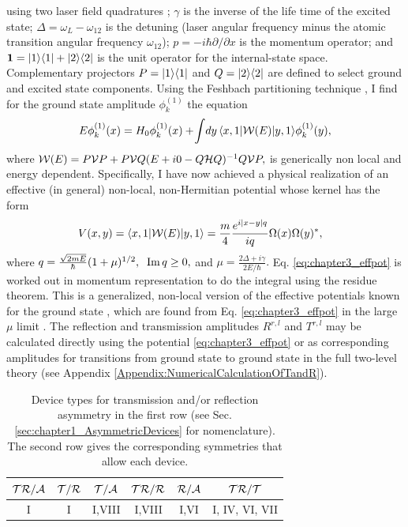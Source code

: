 using two  laser field quadratures  \cite{Zhang2013};
$\gamma$ is the inverse of the life time of the excited state;
$\Delta=\omega_{L}-\omega_{12}$
is the detuning (laser angular frequency minus the atomic transition
angular frequency $\omega_{12}$);
${p}=-i\hbar\partial/\partial x$ is the momentum operator;
and ${\bf 1}=|1\rangle\langle 1|+|2\rangle\langle 2|$ is the unit operator
for the internal-state space.
Complementary projectors
%
$P=|1\rangle\langle 1|$ and $Q=|2\rangle\langle 2|$
%
are defined to select ground and excited state components.
Using the Feshbach partitioning
technique \cite{Feshbach1958,Feshbach1962,Levine1969},
I find for the ground
state amplitude $\phi_k^{(1)}$ the equation
%
\begin{equation}\label{effecti}
  E\phi_k^{(1)}(x) = H_0\phi_k^{(1)}(x)+\!
  \int\! dy\, \la x,1|{\cal W}(E)|y,1\ra \phi_k^{(1)}(y),
\end{equation}
%
where
%
$
{\cal W}(E)=P{\cal V}P+P{\cal V}Q(E+i0-Q{\cal H}Q)^{-1}Q{\cal V}P,
$
%
is generically non local and energy dependent. Specifically, I have now achieved
a physical realization of an effective (in general) non-local, non-Hermitian potential whose kernel has the form
%
\begin{eqnarray}
  \hspace*{-.3cm}V (x,y) = \la x,1|{\cal W}(E)|y,1\ra = \frac{m}{4} \frac{e^{i|x-y|q}}{i q}
  \Omega(x)\Omega(y)^*,
  \label{eq:chapter3_effpot}
\end{eqnarray}
%
%
where
$
q=\frac{\sqrt{2mE}}{\hbar}(1+\mu)^{1/2},\;\;
{\rm Im}\,q\ge 0,
\label{qeq}
$ and
$
\mu=\frac{2\Delta+i\gamma}{2E/\hbar}.
$
%
Eq. \eqref{eq:chapter3_effpot} is worked out  in momentum representation to do the integral
using the residue theorem.
This is a generalized, non-local version of the effective potentials known for the ground state
\cite{Chudesnikov1991,Oberthaler1996}, which are found from Eq. \eqref{eq:chapter3_effpot}  in the large $\mu$ limit \cite{Ruschhaupt2004a}.
The reflection and transmission amplitudes $R^{r,l}$ and  $T^{r,l}$ may be calculated directly
using the potential \eqref{eq:chapter3_effpot} or as corresponding amplitudes for
transitions from ground state to ground state in the full two-level theory (see Appendix \ref{Appendix:NumericalCalculationOfTandR}).

\begin{table}
  \caption{Device types for  transmission and/or reflection asymmetry in the first row (see Sec. \ref{sec:chapter1_AsymmetricDevices} for nomenclature).
  The second row gives the corresponding symmetries  that allow
  each device.
  \label{devices}}
  \vspace*{.0cm}
  \label{tab:chapter3_table2PhysicalImplementation}
  \centering
  \begin{tabular}{cccccc}
    \hline\hline
    $\cal{TR/A}$ & $\cal{T/R}$ & $\cal{T/A}$ & $\cal{TR/R}$ & $\cal{R/A}$ & $\cal{TR/T}$ \\
    \hline
    I            & I           & I,VIII      & I,VIII       & I,VI        & I, IV, VI, VII
    \\
    \hline\hline
  \end{tabular}
\end{table}
%

